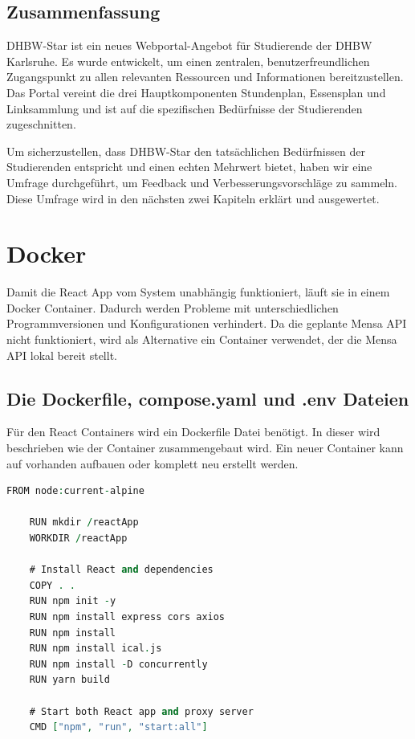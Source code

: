 \subsection{Zusammenfassung}
DHBW-Star ist ein neues Webportal-Angebot für Studierende der DHBW Karlsruhe. Es wurde entwickelt, um einen zentralen, benutzerfreundlichen Zugangspunkt zu allen relevanten Ressourcen und Informationen bereitzustellen. Das Portal vereint die drei Hauptkomponenten Stundenplan, Essensplan und Linksammlung und ist auf die spezifischen Bedürfnisse der Studierenden zugeschnitten.

Um sicherzustellen, dass DHBW-Star den tatsächlichen Bedürfnissen der Studierenden entspricht und einen echten Mehrwert bietet, haben wir eine Umfrage durchgeführt, um Feedback und Verbesserungsvorschläge zu sammeln.
Diese Umfrage wird in den nächsten zwei Kapiteln erklärt und ausgewertet.
\newpage
\section{Docker}

Damit die React App vom System unabhängig funktioniert, läuft sie in einem Docker Container. Dadurch werden Probleme mit unterschiedlichen Programmversionen und Konfigurationen verhindert.
Da die geplante Mensa API nicht funktioniert, wird als Alternative ein Container verwendet, der die Mensa API lokal bereit stellt.

\subsection{Die Dockerfile, compose.yaml und .env Dateien}

Für den React Containers wird ein Dockerfile Datei benötigt. In dieser wird beschrieben wie der Container zusammengebaut wird. Ein neuer Container kann auf vorhanden aufbauen oder komplett neu erstellt werden.

\begin{lstlisting}[language=vhdl,
	frame=single,           % Ein Rahmen um den Code
	framexleftmargin=15pt,  % Rahmen link von den Zahlen
	style=algoBericht,
	label={Dockerfile},
	captionpos=b           % Caption unter den Code setzen
	caption={Dockerfile für DHBW-Star}]
	FROM node:current-alpine
	
	RUN mkdir /reactApp
	WORKDIR /reactApp
	
	# Install React and dependencies
	COPY . .
	RUN npm init -y
	RUN npm install express cors axios
	RUN npm install
	RUN npm install ical.js
	RUN npm install -D concurrently
	RUN yarn build
	
	# Start both React app and proxy server
	CMD ["npm", "run", "start:all"]
\end{lstlisting}

